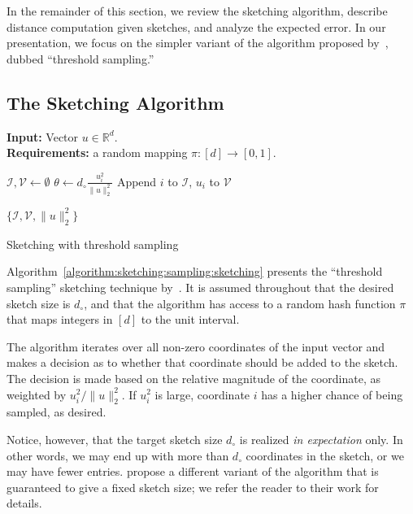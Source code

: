 In the remainder of this section, we review the sketching algorithm,
describe distance computation given sketches, and analyze the expected error.
In our presentation, we focus on the simpler variant of the algorithm proposed
by~\cite{daliri2023sampling}, dubbed ``threshold sampling.''

\subsection{The Sketching Algorithm}

\begin{algorithm}[!t]
\SetAlgoLined
{\bf Input: }{Vector $u \in \mathbb{R}^d$.}\\
{\bf Requirements: }{a random mapping $\pi: [d] \rightarrow [0, 1]$.}\\

\begin{algorithmic}[1]
    \STATE $\mathcal{I}, \mathcal{V} \leftarrow \emptyset$
        \STATE $\theta \leftarrow d_\circ \frac{u_i^2}{\lVert u \rVert_2^2}$
            \STATE Append $i$ to $\mathcal{I}$, $u_i$ to $\mathcal{V}$
        \ENDIF
    \ENDFOR
    
    \RETURN $\{ \mathcal{I}, \mathcal{V}, \lVert u \rVert_2^2 \}$
 \end{algorithmic}
 \caption{Sketching with threshold sampling}
\label{algorithm:sketching:sampling:sketching}
\end{algorithm}

Algorithm~\ref{algorithm:sketching:sampling:sketching} presents the ``threshold sampling''
sketching technique by~\cite{daliri2023sampling}. It is assumed throughout that the desired
sketch size is $d_\circ$, and that the algorithm has access to a random hash function
$\pi$ that maps integers in $[d]$ to the unit interval.

The algorithm iterates over all non-zero coordinates of the input vector and makes a decision
as to whether that coordinate should be added to the sketch. The decision is made based
on the relative magnitude of the coordinate, as weighted by $u_i^2/\lVert u \rVert_2^2$.
If $u_i^2$ is large, coordinate $i$ has a higher chance of being sampled, as desired.

Notice, however, that the target sketch size $d_\circ$ is realized \emph{in expectation} only.
In other words, we may end up with more than $d_\circ$ coordinates in the sketch, or
we may have fewer entries. \cite{daliri2023sampling} propose a different variant of the algorithm
that is guaranteed to give a fixed sketch size; we refer the reader to their work for details.

